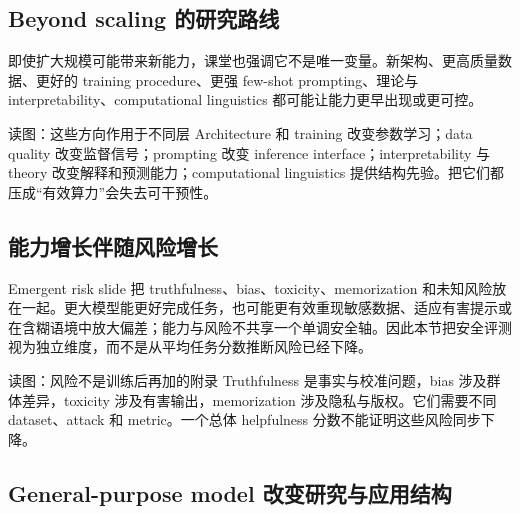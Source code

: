 \subsection{Beyond scaling 的研究路线}

即使扩大规模可能带来新能力，课堂也强调它不是唯一变量。新架构、更高质量数据、更好的 training procedure、更强 few-shot prompting、理论与 interpretability、computational linguistics 都可能让能力更早出现或更可控。


\begin{knowledgebox}{读图：这些方向作用于不同层}
Architecture 和 training 改变参数学习；data quality 改变监督信号；prompting 改变 inference interface；interpretability 与 theory 改变解释和预测能力；computational linguistics 提供结构先验。把它们都压成“有效算力”会失去可干预性。
\end{knowledgebox}

\subsection{能力增长伴随风险增长}

Emergent risk slide 把 truthfulness、bias、toxicity、memorization 和未知风险放在一起。更大模型能更好完成任务，也可能更有效重现敏感数据、适应有害提示或在含糊语境中放大偏差；能力与风险不共享一个单调安全轴。因此本节把安全评测视为独立维度，而不是从平均任务分数推断风险已经下降。


\begin{knowledgebox}{读图：风险不是训练后再加的附录}
Truthfulness 是事实与校准问题，bias 涉及群体差异，toxicity 涉及有害输出，memorization 涉及隐私与版权。它们需要不同 dataset、attack 和 metric。一个总体 helpfulness 分数不能证明这些风险同步下降。
\end{knowledgebox}


\subsection{General-purpose model 改变研究与应用结构}

